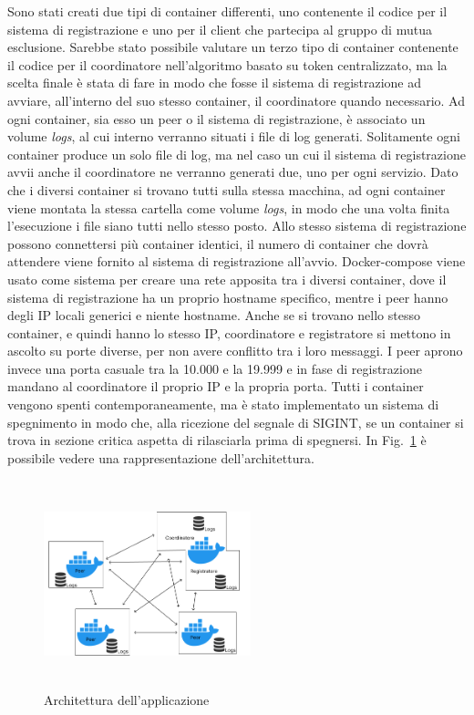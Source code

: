 \documentclass[conference]{IEEEtran}
\begin{document}
Sono stati creati due tipi di container differenti, uno contenente il codice per il sistema di registrazione e uno per il client che partecipa al gruppo di mutua esclusione. Sarebbe stato possibile valutare un terzo tipo di container contenente il codice per il coordinatore nell'algoritmo basato su token centralizzato, ma la scelta finale è stata di fare in modo che fosse il sistema di registrazione ad avviare, all'interno del suo stesso container, il coordinatore quando necessario. Ad ogni container, sia esso un peer o il sistema di registrazione, è associato un volume \textit{logs}, al cui interno verranno situati i file di log generati. Solitamente ogni container produce un solo file di log, ma nel caso un cui il sistema di registrazione avvii anche il coordinatore ne verranno generati due, uno per ogni servizio. Dato che i diversi container si trovano tutti sulla stessa macchina, ad ogni container viene montata la stessa cartella come volume \textit{logs}, in modo che una volta finita l'esecuzione i file siano tutti nello stesso posto. 
Allo stesso sistema di registrazione possono connettersi più container identici, il numero di container che dovrà attendere viene fornito al sistema di registrazione all'avvio. Docker-compose viene usato come sistema per creare una rete apposita tra i diversi container, dove il sistema di registrazione ha un proprio hostname specifico, mentre i peer hanno degli IP locali generici e niente hostname. Anche se si trovano nello stesso container, e quindi hanno lo stesso IP, coordinatore e registratore si mettono in ascolto su porte diverse, per non avere conflitto tra i loro messaggi. I peer aprono invece una porta casuale tra la 10.000 e la 19.999 e in fase di registrazione mandano al coordinatore il proprio IP e la propria porta. Tutti i container vengono spenti contemporaneamente, ma è stato implementato un sistema di spegnimento in modo che, alla ricezione del segnale di SIGINT, se un container si trova in sezione critica aspetta di rilasciarla prima di spegnersi. In Fig.~\ref{fig} è possibile vedere una rappresentazione dell'architettura. 

\begin{figure}[htbp]
\centerline{\includegraphics[width=6cm,height=6cm,keepaspectratio]{arch.png}}
\caption{Architettura dell'applicazione}
\label{fig}
\end{figure}
\end{document}

